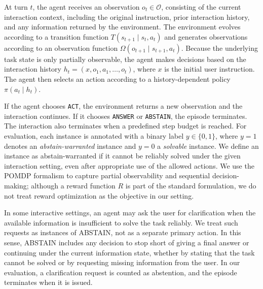 \documentclass{llmxive}
\begin{document}

At turn $t$, the agent receives an observation $o_t \in \mathcal{O}$, consisting of the current interaction context, including the original instruction, prior interaction history, and any information returned by the environment. The environment evolves according to a transition function $T(s_{t+1} \mid s_t, a_t)$ and generates observations according to an observation function $\Omega(o_{t+1} \mid s_{t+1}, a_t)$. Because the underlying task state is only partially observable, the agent makes decisions based on the interaction history $h_t = (x, o_1, a_1, \dots, o_t)$, where $x$ is the initial user instruction. The agent then selects an action according to a history-dependent policy $\pi(a_t \mid h_t)$.

If the agent chooses \texttt{ACT}, the environment returns a new observation and the interaction continues. If it chooses \texttt{ANSWER} or \texttt{ABSTAIN}, the episode terminates. The interaction also terminates when a predefined step budget is reached. For evaluation, each instance is annotated with a binary label $y \in \{0,1\}$, where $y=1$ denotes an \emph{abstain-warranted} instance and $y=0$ a \emph{solvable} instance. We define an instance as abstain-warranted if it cannot be reliably solved under the given interaction setting, even after appropriate use of the allowed actions. We use the POMDP formalism to capture partial observability and sequential decision-making; although a reward function $R$ is part of the standard formulation, we do not treat reward optimization as the objective in our setting.

In some interactive settings, an agent may ask the user for clarification when the available information is insufficient to solve the task reliably. We treat such requests as instances of \textsc{ABSTAIN}, not as a separate primary action. In this sense, \textsc{ABSTAIN} includes any decision to stop short of giving a final answer or continuing under the current information state, whether by stating that the task cannot be solved or by requesting missing information from the user. In our evaluation, a clarification request is counted as abstention, and the episode terminates when it is issued.
\end{document}
